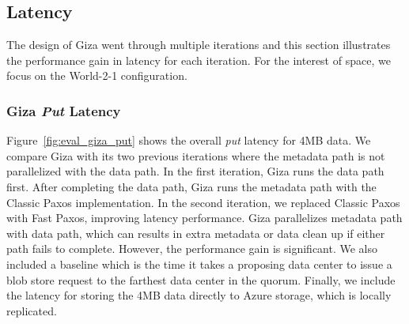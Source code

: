 


\subsection{\name Latency}

The design of Giza went through multiple iterations and this section illustrates the performance gain in latency for each iteration. For the interest of space, we focus on the World-2-1 configuration.

\subsubsection{Giza {\em Put} Latency}


Figure~\ref{fig:eval_giza_put} shows the \name overall {\em put} latency for 4MB data. We compare Giza with its two previous iterations where the metadata path is not parallelized with the data path. In the first iteration, Giza runs the data path first. After completing the data path, Giza runs the metadata path with the Classic Paxos implementation. In the second iteration, we replaced Classic Paxos with Fast Paxos, improving latency performance. Giza parallelizes metadata path with data path, which can results in extra metadata or data clean up if either path fails to complete. However, the performance gain is significant. We also included a baseline which is the time it takes a proposing data center to issue a blob store request to the farthest data center in the quorum. Finally, we include the latency for storing the 4MB data directly to Azure storage, which is locally replicated.

